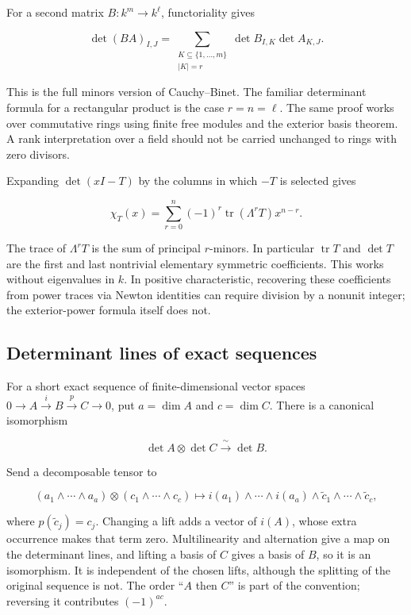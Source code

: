 \documentclass[
  11pt,
]{article}
\begin{document}
For a second matrix \(B:k^m\to k^\ell\), functoriality gives

\[\det(BA)_{I,J}
=\sum_{\substack{K\subseteq\{1,\ldots,m\}\\|K|=r}}
\det B_{I,K}\det A_{K,J}.\]

This is the full minors version of Cauchy--Binet. The familiar
determinant formula for a rectangular product is the case \(r=n=\ell\).
The same proof works over commutative rings using finite free modules
and the exterior basis theorem. A rank interpretation over a field
should not be carried unchanged to rings with zero divisors.

Expanding \(\det(xI-T)\) by the columns in which \(-T\) is selected
gives

\[\chi_T(x)=\sum_{r=0}^n(-1)^r
\operatorname{tr}(\Lambda^rT)x^{n-r}.\]

The trace of \(\Lambda^rT\) is the sum of principal \(r\)-minors. In
particular \(\operatorname{tr}T\) and \(\det T\) are the first and last
nontrivial elementary symmetric coefficients. This works without
eigenvalues in \(k\). In positive characteristic, recovering these
coefficients from power traces via Newton identities can require
division by a nonunit integer; the exterior-power formula itself does
not.

\subsection{Determinant lines of exact
sequences}\label{determinant-lines-of-exact-sequences}

For a short exact sequence of finite-dimensional vector spaces
\(0\to A\xrightarrow{i}B\xrightarrow{p}C\to0\), put \(a=\dim A\) and
\(c=\dim C\). There is a canonical isomorphism

\[\det A\otimes\det C\xrightarrow{\ \sim\ }\det B.\]

Send a decomposable tensor to

\[(a_1\wedge\cdots\wedge a_a)\otimes(c_1\wedge\cdots\wedge c_c)
\longmapsto
i(a_1)\wedge\cdots\wedge i(a_a)
\wedge\widetilde c_1\wedge\cdots\wedge\widetilde c_c,\]

where \(p(\widetilde c_j)=c_j\). Changing a lift adds a vector of
\(i(A)\), whose extra occurrence makes that term zero. Multilinearity
and alternation give a map on the determinant lines, and lifting a basis
of \(C\) gives a basis of \(B\), so it is an isomorphism. It is
independent of the chosen lifts, although the splitting of the original
sequence is not. The order ``\(A\) then \(C\)'' is part of the
convention; reversing it contributes \((-1)^{ac}\).
\end{document}
